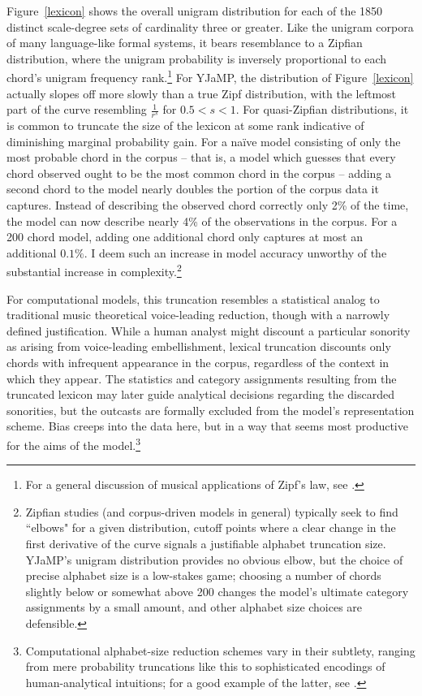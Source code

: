 Figure~\ref{lexicon} shows the overall unigram distribution for each of the 1850 distinct scale-degree sets of cardinality three or greater.  Like the unigram corpora of many language-like formal systems, it bears resemblance to a Zipfian distribution, where the unigram probability is inversely proportional to each chord's unigram frequency rank.\footnote{For a general discussion of musical applications of Zipf's law, see \cite{zanette2006}.}  For YJaMP, the distribution of Figure~\ref{lexicon} actually slopes off more slowly than a true Zipf distribution, with the leftmost part of the curve resembling $\frac{1}{r^s}$ for $0.5 < s < 1$.  For quasi-Zipfian distributions, it is common to truncate the size of the lexicon at some rank indicative of diminishing marginal probability gain. For a na\"{i}ve model consisting of only the most probable chord in the corpus -- that is, a model which guesses that every chord observed ought to be the most common chord in the corpus -- adding a second chord to the model nearly doubles the portion of the corpus data it captures.  Instead of describing the observed chord correctly only 2\% of the time, the model can now describe nearly 4\% of the observations in the corpus.  For a 200 chord model, adding one additional chord only captures at most an additional $0.1\%$.  I deem such an increase in model accuracy unworthy of the substantial increase in complexity.\footnote{Zipfian studies (and corpus-driven models in general) typically seek to find ``elbows" for a given distribution, cutoff points where a clear change in the first derivative of the curve signals a justifiable alphabet truncation size.  YJaMP's unigram distribution provides no obvious elbow, but the choice of precise alphabet size is a low-stakes game; choosing a number of chords slightly below or somewhat above 200 changes the model's ultimate category assignments by a small amount, and other alphabet size choices are defensible.}

For computational models, this truncation resembles a statistical analog to traditional music theoretical  voice-leading reduction, though with a narrowly defined justification.  While a human analyst might discount a particular sonority as arising from voice-leading embellishment, lexical truncation discounts only chords with infrequent appearance in the corpus, regardless of the context in which they appear.  The statistics and category assignments resulting from the truncated lexicon may later guide analytical decisions regarding the discarded sonorities, but the outcasts are formally excluded from the model's representation scheme.  Bias creeps into the data here, but in a way that seems most productive for the aims of the model.\footnote{Computational alphabet-size reduction schemes vary in their subtlety, ranging from mere probability truncations like this to sophisticated encodings of human-analytical intuitions; for a good example of the latter, see \cite{white2013alphabet}.}


